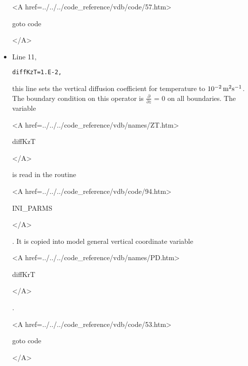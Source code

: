 \begin{itemize}
{\bf
\begin{rawhtml} <A href=../../../code_reference/vdb/code/57.htm> \end{rawhtml}
goto code
\begin{rawhtml} </A>\end{rawhtml}
}

\item Line 11,
\begin{verbatim}
diffKzT=1.E-2,
\end{verbatim}
this line sets the vertical diffusion coefficient for temperature
to $10^{-2}\,{\rm m^{2}s^{-1}}$. The boundary condition on this
operator is $\frac{\partial}{\partial z}$ = 0 on all boundaries.
The variable
{\bf
\begin{rawhtml} <A href=../../../code_reference/vdb/names/ZT.htm> \end{rawhtml}
diffKzT
\begin{rawhtml} </A>\end{rawhtml}
}
is read in the routine
{\it
\begin{rawhtml} <A href=../../../code_reference/vdb/code/94.htm> \end{rawhtml}
INI\_PARMS
\begin{rawhtml} </A>\end{rawhtml}
}.
It is copied into model general vertical coordinate variable
{\bf
\begin{rawhtml} <A href=../../../code_reference/vdb/names/PD.htm> \end{rawhtml}
diffKrT
\begin{rawhtml} </A>\end{rawhtml}
}.

{\bf
\begin{rawhtml} <A href=../../../code_reference/vdb/code/53.htm> \end{rawhtml}
goto code
\begin{rawhtml} </A>\end{rawhtml}
}




\end{itemize}
